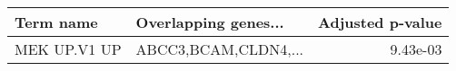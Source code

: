 \begin{tabular}{llr}
\toprule
   Term name & Overlapping genes... &  Adjusted p-value \\
\midrule
MEK UP.V1 UP & ABCC3,BCAM,CLDN4,... &          9.43e-03 \\
\bottomrule
\end{tabular}
